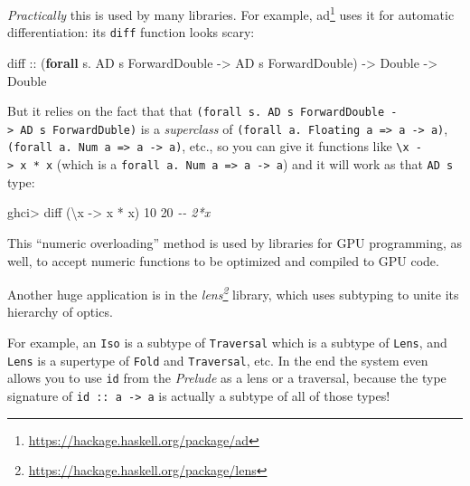 \documentclass[]{article}
\newenvironment{Shaded}{}{}
\newcommand{\CommentTok}[1]{\textcolor[rgb]{0.38,0.63,0.69}{\textit{#1}}}
\newcommand{\DataTypeTok}[1]{\textcolor[rgb]{0.56,0.13,0.00}{#1}}
\newcommand{\DecValTok}[1]{\textcolor[rgb]{0.25,0.63,0.44}{#1}}
\newcommand{\KeywordTok}[1]{\textcolor[rgb]{0.00,0.44,0.13}{\textbf{#1}}}
\newcommand{\NormalTok}[1]{#1}
\newcommand{\OperatorTok}[1]{\textcolor[rgb]{0.40,0.40,0.40}{#1}}
\newcommand{\OtherTok}[1]{\textcolor[rgb]{0.00,0.44,0.13}{#1}}
\renewcommand{\href}[2]{#2\footnote{\url{#1}}}
\begin{document}
\emph{Practically} this is used by many libraries. For example,
\href{https://hackage.haskell.org/package/ad}{ad} uses it for automatic
differentiation: its \texttt{diff} function looks scary:

\begin{Shaded}
\begin{Highlighting}[]
\OtherTok{diff ::}\NormalTok{ (}\KeywordTok{forall}\NormalTok{ s}\OperatorTok{.} \DataTypeTok{AD}\NormalTok{ s }\DataTypeTok{ForwardDouble} \OtherTok{{-}\textgreater{}} \DataTypeTok{AD}\NormalTok{ s }\DataTypeTok{ForwardDouble}\NormalTok{) }\OtherTok{{-}\textgreater{}} \DataTypeTok{Double} \OtherTok{{-}\textgreater{}} \DataTypeTok{Double}
\end{Highlighting}
\end{Shaded}

But it relies on the fact that that
\texttt{(forall\ s.\ AD\ s\ ForwardDouble\ -\textgreater{}\ AD\ s\ ForwardDuble)}
is a \emph{superclass} of
\texttt{(forall\ a.\ Floating\ a\ =\textgreater{}\ a\ -\textgreater{}\ a)},
\texttt{(forall\ a.\ Num\ a\ =\textgreater{}\ a\ -\textgreater{}\ a)}, etc., so
you can give it functions like
\texttt{\textbackslash{}x\ -\textgreater{}\ x\ *\ x} (which is a
\texttt{forall\ a.\ Num\ a\ =\textgreater{}\ a\ -\textgreater{}\ a}) and it will
work as that \texttt{AD\ s} type:

\begin{Shaded}
\begin{Highlighting}[]
\NormalTok{ghci}\OperatorTok{\textgreater{}}\NormalTok{ diff (\textbackslash{}x }\OtherTok{{-}\textgreater{}}\NormalTok{ x }\OperatorTok{*}\NormalTok{ x) }\DecValTok{10}
\DecValTok{20}      \CommentTok{{-}{-} 2*x}
\end{Highlighting}
\end{Shaded}

This ``numeric overloading'' method is used by libraries for GPU programming, as
well, to accept numeric functions to be optimized and compiled to GPU code.

Another huge application is in the
\emph{\href{https://hackage.haskell.org/package/lens}{lens}} library, which uses
subtyping to unite its hierarchy of optics.

For example, an \texttt{Iso} is a subtype of \texttt{Traversal} which is a
subtype of \texttt{Lens}, and \texttt{Lens} is a supertype of \texttt{Fold} and
\texttt{Traversal}, etc. In the end the system even allows you to use
\texttt{id} from the \emph{Prelude} as a lens or a traversal, because the type
signature of \texttt{id\ ::\ a\ -\textgreater{}\ a} is actually a subtype of all
of those types!
\end{document}
